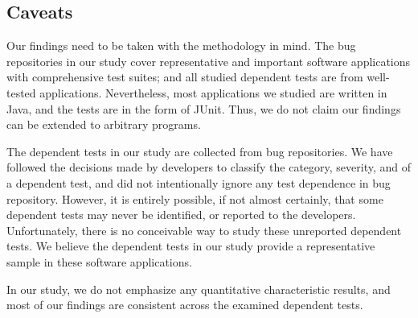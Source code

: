 \subsection{Caveats}

Our findings need to be taken with the methodology in mind. The
bug repositories in our study cover representative and important
software applications with comprehensive test suites; and
all studied dependent tests are from well-tested
applications. Nevertheless, most applications we studied
are written in Java, and the tests are in the form of JUnit.
Thus, we do not claim our findings can be extended to
arbitrary programs.

The dependent tests in our study are collected from bug
repositories. We have followed the decisions made by
developers to classify the category, severity, and
 of a dependent test,
and did not intentionally ignore
any test dependence in bug repository. However,
it is entirely possible, if not almost certainly,
that some dependent tests may never
be identified, or reported to the developers. Unfortunately,
there is no conceivable way to study these unreported
dependent tests. We believe the dependent tests in our study
provide a representative sample in these software applications.

In our study, we do not emphasize any quantitative characteristic
results, and most of our findings are consistent across
the examined dependent tests.
